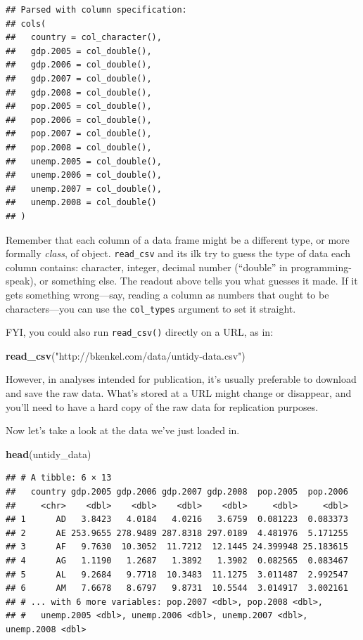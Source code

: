 \documentclass[12pt,oneside,openany]{book}
\newenvironment{Shaded}{\begin{snugshade}}{\end{snugshade}}
\newcommand{\KeywordTok}[1]{\textcolor[rgb]{0.13,0.29,0.53}{\textbf{{#1}}}}
\newcommand{\StringTok}[1]{\textcolor[rgb]{0.31,0.60,0.02}{{#1}}}
\newcommand{\NormalTok}[1]{{#1}}
\begin{document}
\begin{verbatim}
## Parsed with column specification:
## cols(
##   country = col_character(),
##   gdp.2005 = col_double(),
##   gdp.2006 = col_double(),
##   gdp.2007 = col_double(),
##   gdp.2008 = col_double(),
##   pop.2005 = col_double(),
##   pop.2006 = col_double(),
##   pop.2007 = col_double(),
##   pop.2008 = col_double(),
##   unemp.2005 = col_double(),
##   unemp.2006 = col_double(),
##   unemp.2007 = col_double(),
##   unemp.2008 = col_double()
## )
\end{verbatim}

Remember that each column of a data frame might be a different type, or
more formally \emph{class}, of object. \texttt{read\_csv} and its ilk
try to guess the type of data each column contains: character, integer,
decimal number (``double'' in programming-speak), or something else. The
readout above tells you what guesses it made. If it gets something
wrong---say, reading a column as numbers that ought to be
characters---you can use the \texttt{col\_types} argument to set it
straight.

FYI, you could also run \texttt{read\_csv()} directly on a URL, as in:

\begin{Shaded}
\begin{Highlighting}[]
\KeywordTok{read_csv}\NormalTok{(}\StringTok{"http://bkenkel.com/data/untidy-data.csv"}\NormalTok{)}
\end{Highlighting}
\end{Shaded}

However, in analyses intended for publication, it's usually preferable
to download and save the raw data. What's stored at a URL might change
or disappear, and you'll need to have a hard copy of the raw data for
replication purposes.

Now let's take a look at the data we've just loaded in.

\begin{Shaded}
\begin{Highlighting}[]
\KeywordTok{head}\NormalTok{(untidy_data)}
\end{Highlighting}
\end{Shaded}

\begin{verbatim}
## # A tibble: 6 × 13
##   country gdp.2005 gdp.2006 gdp.2007 gdp.2008  pop.2005  pop.2006
##     <chr>    <dbl>    <dbl>    <dbl>    <dbl>     <dbl>     <dbl>
## 1      AD   3.8423   4.0184   4.0216   3.6759  0.081223  0.083373
## 2      AE 253.9655 278.9489 287.8318 297.0189  4.481976  5.171255
## 3      AF   9.7630  10.3052  11.7212  12.1445 24.399948 25.183615
## 4      AG   1.1190   1.2687   1.3892   1.3902  0.082565  0.083467
## 5      AL   9.2684   9.7718  10.3483  11.1275  3.011487  2.992547
## 6      AM   7.6678   8.6797   9.8731  10.5544  3.014917  3.002161
## # ... with 6 more variables: pop.2007 <dbl>, pop.2008 <dbl>,
## #   unemp.2005 <dbl>, unemp.2006 <dbl>, unemp.2007 <dbl>, unemp.2008 <dbl>
\end{verbatim}
\end{document}
